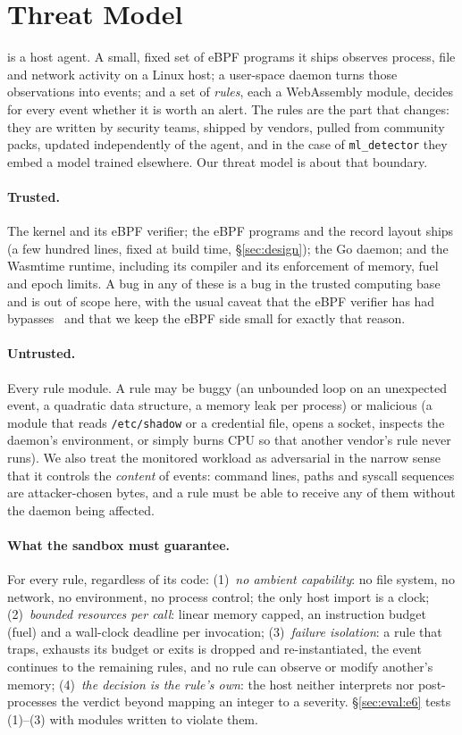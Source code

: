 \section{Threat Model}
\label{sec:threat}

\sys is a host agent. A small, fixed set of eBPF programs it ships observes
process, file and network activity on a Linux host; a user-space daemon
turns those observations into events; and a set of \emph{rules}, each a
WebAssembly module, decides for every event whether it is worth an alert.
The rules are the part that changes: they are written by security teams,
shipped by vendors, pulled from community packs, updated independently of
the agent, and in the case of \texttt{ml\_detector} they embed a model
trained elsewhere. Our threat model is about that boundary.

\paragraph{Trusted.}
The kernel and its eBPF verifier; the eBPF programs and the record layout
\sys ships (a few hundred lines, fixed at build time, \S\ref{sec:design});
the Go daemon; and the Wasmtime runtime, including its compiler and its
enforcement of memory, fuel and epoch limits. A bug in any of these is a
bug in the trusted computing base and is out of scope here, with the usual
caveat that the eBPF verifier has had bypasses~\cite{ebpf-bugs} and that we
keep the eBPF side small for exactly that reason.

\paragraph{Untrusted.}
Every rule module. A rule may be buggy (an unbounded loop on an unexpected
event, a quadratic data structure, a memory leak per process) or malicious
(a module that reads \texttt{/etc/shadow} or a credential file, opens a
socket, inspects the daemon's environment, or simply burns CPU so that
another vendor's rule never runs). We also treat the monitored workload as
adversarial in the narrow sense that it controls the \emph{content} of
events: command lines, paths and syscall sequences are attacker-chosen
bytes, and a rule must be able to receive any of them without the daemon
being affected.

\paragraph{What the sandbox must guarantee.}
For every rule, regardless of its code: (1)~\emph{no ambient capability}:
no file system, no network, no environment, no process control; the only
host import is a clock; (2)~\emph{bounded resources per call}: linear memory
capped, an instruction budget (fuel) and a wall-clock deadline per
invocation; (3)~\emph{failure isolation}: a rule that traps, exhausts its
budget or exits is dropped and re-instantiated, the event continues to the
remaining rules, and no rule can observe or modify another's memory;
(4)~\emph{the decision is the rule's own}: the host neither interprets nor
post-processes the verdict beyond mapping an integer to a severity.
\S\ref{sec:eval:e6} tests (1)--(3) with modules written to violate them.

